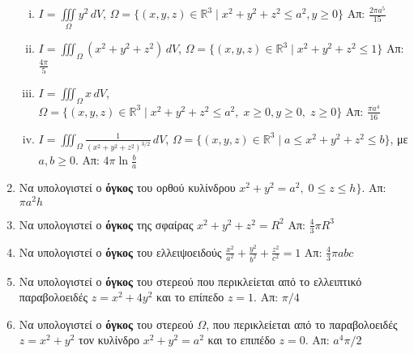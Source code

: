 \begin{enumerate}
    \begin{enumerate}[i)]
      \item $ I = \iiint\limits_{\Omega} y^{2} \,dV $, \quad $ \Omega = \{(x,y,z)\in 
        \mathbb{R}^{3} \mid x^{2}+y^{2}+z^{2} \leq a^{2}, y \geq 0 \} $ 
        \hfill Απ: $ \frac{2 \pi a^{5}}{15} $ 
      \item $ I= \iiint_{\Omega} (x^{2}+y^{2}+z^{2})\,dV $, \quad $ \Omega = 
        \{(x,y,z)\in \mathbb{R}^{3} \mid x^{2}+y^{2}+z^{2} \leq 1 \}$ 
        \hfill Απ: $ \frac{4 \pi}{5} $ 
      \item $ I=\iiint_{\Omega} x\,dV $, \quad $ \Omega = \{(x,y,z)\in \mathbb{R}^{3} 
        \mid x^{2}+y^{2}+z^{2} \leq a^{2},\; x \geq 0, y \geq 0,\; z \geq 0\} $ 
        \hfill Απ: $ \frac{\pi a^{4}}{16} $ 
      \item $ I = \iiint_{\Omega} \frac{1}{(x^{2}+y^{2}+z^{2})^{3/2}} \,dV$, \quad 
        $\Omega = \{ (x,y,z) \in \mathbb{R}^{3} \mid a \leq x^{2}+y^{2}+z^{2} \leq b \}$,
        με $ a,b \geq 0 $. \hfill Απ: $ 4 \pi \ln{\frac{b}{a}} $ 
    \end{enumerate}


  \item Να υπολογιστεί ο \textbf{όγκος} του ορθού κυλίνδρου $ x^{2}+y^{2} = a^{2},
  \; 0 \leq z \leq h \}  $.  \hfill Απ:  $ \pi a^{2} h $

  \item Να υπολογιστεί ο \textbf{όγκος} της σφαίρας $ x^{2}+y^{2}+z^{2} = R^{2} $
    \hfill Απ: $ \frac{4}{3} \pi R^{3} $ 

  \item Να υπολογιστεί ο \textbf{όγκος} του ελλειψοειδούς $ \frac{x^{2}}{a^{2}} +
    \frac{y^{2}}{b^{2}} + \frac{z^{2}}{c^{2}} =1 $ 
    \hfill Απ: $ \frac{4}{3} \pi abc $ 

  \item Να υπολογιστεί ο \textbf{όγκος} του στερεού που περικλείεται από το 
    ελλειπτικό παραβολοειδές $ z=x^{2}+4y^{2} $ και το επίπεδο $ z=1 $. 
    \hfill Απ: $ \pi /4 $ 

  \item Να υπολογιστεί ο \textbf{όγκος} του στερεού $ \Omega $, που περικλείεται από 
    το παραβολοειδές $ z = x^{2}+y^{2} $ τον κυλίνδρο $ x^{2}+y^{2}=a^{2} $ και 
    το επιπέδο $ z = 0$.  
    \hfill Απ: $ a^{4} {\pi}/{2} $  


\end{enumerate}
